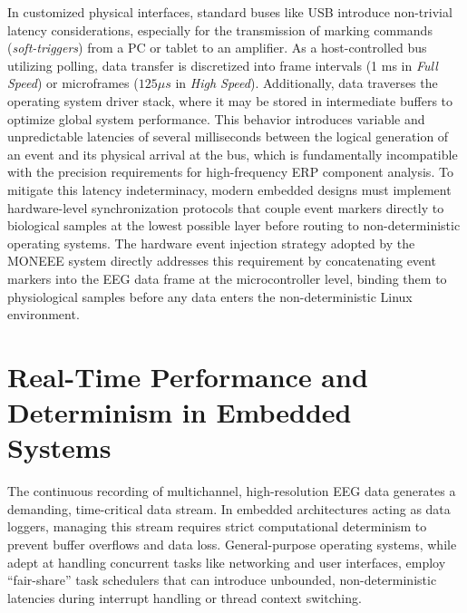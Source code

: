 In customized physical interfaces, standard buses like USB introduce non-trivial latency considerations, especially for the transmission of marking commands (\textit{soft-triggers}) from a PC or tablet to an amplifier. As a host-controlled bus utilizing polling, data transfer is discretized into frame intervals (1 ms in \textit{Full Speed}) or microframes ($125 \mu s$ in \textit{High Speed}). Additionally, data traverses the operating system driver stack, where it may be stored in intermediate buffers to optimize global system performance. This behavior introduces variable and unpredictable latencies of several milliseconds between the logical generation of an event and its physical arrival at the bus, which is fundamentally incompatible with the precision requirements for high-frequency ERP component analysis. To mitigate this latency indeterminacy, modern embedded designs must implement hardware-level synchronization protocols that couple event markers directly to biological samples at the lowest possible layer before routing to non-deterministic operating systems. The hardware event injection strategy adopted by the MONEEE system directly addresses this requirement by concatenating event markers into the EEG data frame at the microcontroller level, binding them to physiological samples before any data enters the non-deterministic Linux environment.

\section{Real-Time Performance and Determinism in Embedded Systems}
\label{sec:real_time_perf}

The continuous recording of multichannel, high-resolution EEG data generates a demanding, time-critical data stream. In embedded architectures acting as data loggers, managing this stream requires strict computational determinism to prevent buffer overflows and data loss. General-purpose operating systems, while adept at handling concurrent tasks like networking and user interfaces, employ ``fair-share'' task schedulers that can introduce unbounded, non-deterministic latencies during interrupt handling or thread context switching.

